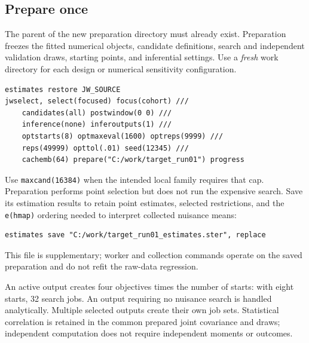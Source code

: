 \documentclass[11pt]{article}
\newcommand{\cmd}[1]{\texttt{#1}}
\begin{document}
\subsection{Prepare once}
The parent of the new preparation directory must already exist.
Preparation freezes the fitted numerical objects, candidate definitions,
search and independent validation draws, starting points, and inferential
settings. Use a \emph{fresh} work directory for each design or numerical
sensitivity configuration.
\begin{lstlisting}
estimates restore JW_SOURCE
jwselect, select(focused) focus(cohort) ///
    candidates(all) postwindow(0 0) ///
    inference(none) inferoutputs(1) ///
    optstarts(8) optmaxeval(1600) optreps(9999) ///
    reps(49999) opttol(.01) seed(12345) ///
    cachemb(64) prepare("C:/work/target_run01") progress
\end{lstlisting}
Use \cmd{maxcand(16384)} when the intended local family requires that cap.
Preparation performs point selection but does not run the expensive search.
Save its estimation results to retain point estimates, selected restrictions,
and the \cmd{e(hmap)} ordering needed to interpret collected nuisance means:
\begin{lstlisting}
estimates save "C:/work/target_run01_estimates.ster", replace
\end{lstlisting}
This file is supplementary; worker and collection commands operate on the saved preparation and
do not refit the raw-data regression.

An active output creates four objectives times the number of starts: with
eight starts, 32 search jobs. An output requiring no nuisance search is handled
analytically. Multiple selected outputs create their own job sets. Statistical
correlation is retained in the common prepared joint covariance and draws;
independent computation does not require independent moments or outcomes.
\end{document}

